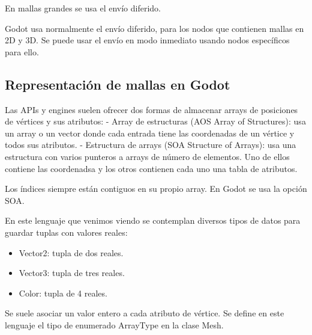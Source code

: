 \documentclass[12pt]{report} %
\providecommand{\tightlist}{%
  \setlength{\itemsep}{0pt}\setlength{\parskip}{0pt}}
\begin{document}
En mallas grandes se usa el envío diferido.

Godot usa normalmente el envío diferido, para los nodos que contienen
mallas en 2D y 3D. Se puede usar el envío en modo inmediato usando nodos
específicos para ello.

\hypertarget{representaciuxf3n-de-mallas-en-godot}{%
\subsection{Representación de mallas en
Godot}\label{representaciuxf3n-de-mallas-en-godot}}

Las APIs y engines suelen ofrecer dos formas de almacenar arrays de
posiciones de vértices y sus atributos: - Array de estructuras (AOS
Array of Structures): usa un array o un vector donde cada entrada tiene
las coordenadas de un vértice y todos sus atributos. - Estructura de
arrays (SOA Structure of Arrays): usa una estructura con varios punteros
a arrays de número de elementos. Uno de ellos contiene las coordenadsa y
los otros contienen cada uno una tabla de atributos.

Los índices siempre están contiguos en su propio array. En Godot se usa
la opción SOA.

En este lenguaje que venimos viendo se contemplan diversos tipos de
datos para guardar tuplas con valores reales:

\begin{itemize}
\tightlist
\item
  Vector2: tupla de dos reales.
\item
  Vector3: tupla de tres reales.
\item
  Color: tupla de 4 reales.
\end{itemize}

Se suele asociar un valor entero a cada atributo de vértice. Se define
en este lenguaje el tipo de enumerado ArrayType en la clase Mesh.
\end{document}
